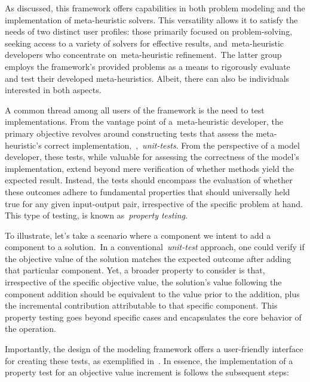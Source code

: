 As discussed, this framework offers capabilities in both problem modeling and
the implementation of meta-heuristic solvers. This versatility allows it to
satisfy the needs of two distinct user profiles: those primarily focused on
problem-solving, seeking access to a variety of solvers for effective results,
and~\acrshort{meta-heuristic} developers who concentrate
on~\acrshort{meta-heuristic} refinement.~The latter group employs the
framework's provided problems as a means to rigorously evaluate and test their
developed meta-heuristics. Albeit, there can also be individuals interested in both
aspects.

A common thread among all users of the framework is the need to test
implementations. From the vantage point of a~\acrshort{meta-heuristic}
developer, the primary objective revolves around constructing tests that assess
the meta-heuristic's correct implementation,~\eg{},~\textit{unit-tests}. From
the perspective of a model developer, these tests, while valuable for assessing
the correctness of the model's implementation, extend beyond mere verification
of whether methods yield the expected result. Instead, the tests should
encompass the evaluation of whether these outcomes adhere to fundamental
properties that should universally held true for any given input-output pair,
irrespective of the specific problem at hand. This type of testing, is known
as~\textit{property testing}.

To illustrate, let's take a scenario where a component we intent to add a
component to a solution.~In a conventional~\textit{unit-test} approach, one
could verify if the objective value of the solution matches the expected outcome
after adding that particular component. Yet, a broader property to consider is
that, irrespective of the specific objective value, the solution's value
following the component addition should be equivalent to the value prior to the
addition, plus the incremental contribution attributable to that specific
component. This property testing goes beyond specific cases and encapsulates the
core behavior of the operation.



Importantly, the design of the modeling framework offers a user-friendly
interface for creating these tests, as exemplified in~. In
essence, the implementation of a property test for an objective value increment
is follows the subsequent steps:

